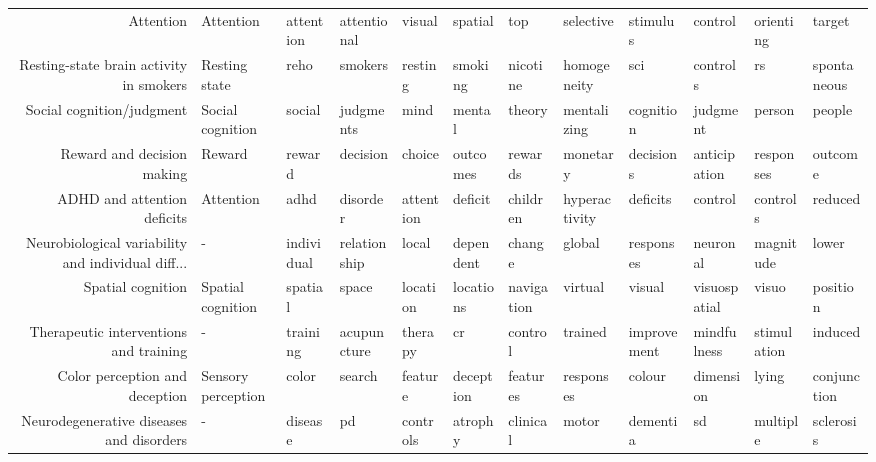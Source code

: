 \documentclass[english]{article}
\begin{document}
\begin{landscape}
\begin{supertabular}{rlllllllllll}
                           Attention &           Attention &        attention &   attentional &          visual &        spatial &         top &      selective &      stimulus &        control &     orienting &         target \\
Resting-state brain activity in smokers &       Resting state &             reho &       smokers &         resting &        smoking &    nicotine &    homogeneity &           sci &       controls &            rs &    spontaneous \\
           Social cognition/judgment &    Social cognition &           social &     judgments &            mind &         mental &      theory &    mentalizing &     cognition &       judgment &        person &         people \\
          Reward and decision making &              Reward &           reward &      decision &          choice &       outcomes &     rewards &       monetary &     decisions &   anticipation &     responses &        outcome \\
         ADHD and attention deficits &           Attention &             adhd &      disorder &       attention &        deficit &    children &  hyperactivity &      deficits &        control &      controls &        reduced \\
Neurobiological variability and individual diff... &                   - &       individual &  relationship &           local &      dependent &      change &         global &     responses &       neuronal &     magnitude &          lower \\
                   Spatial cognition &   Spatial cognition &          spatial &         space &        location &      locations &  navigation &        virtual &        visual &   visuospatial &         visuo &       position \\
Therapeutic interventions and training &                   - &         training &   acupuncture &         therapy &             cr &     control &        trained &   improvement &    mindfulness &   stimulation &        induced \\
      Color perception and deception &  Sensory perception &            color &        search &         feature &      deception &    features &      responses &        colour &      dimension &         lying &    conjunction \\
Neurodegenerative diseases and disorders &                   - &          disease &            pd &        controls &        atrophy &    clinical &          motor &      dementia &             sd &      multiple &      sclerosis \\

\end{supertabular}
\end{landscape}
\end{document}
